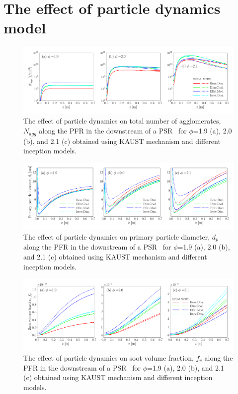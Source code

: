 \section{The effect of particle dynamics model}

\begin{figure}[H]
	\centering
	\includegraphics[width=1\textwidth]{Figures/Results/PSR/N_agg_eq_ratio_pdynamiceffect.pdf}
	\caption{The effect of particle dynamics on total number of agglomerates, $N_{agg}$ along the PFR in the downstream of a PSR~\citep{manzello2007soot} for $\phi$=1.9 (a), 2.0 (b), and 2.1 (c) obtained using KAUST mechanism and different inception models.}
	\label{fig:psr_Nagg_pdynamicseffect} 
\end{figure}

\begin{figure}[H]
	\centering
	\includegraphics[width=1\textwidth]{Figures/Results/PSR/d_p_eq_ratio_pdynamiceffect.pdf}
	\caption{The effect of particle dynamics on primary particle diameter, $d_{p}$ along the PFR in the downstream of a PSR~\citep{manzello2007soot} for $\phi$=1.9 (a), 2.0 (b), and 2.1 (c) obtained using KAUST mechanism and different inception models.}
	\label{fig:psr_d_p_pdynamicseffect} 
\end{figure}


\begin{figure}[H]
	\centering
	\includegraphics[width=1\textwidth]{Figures/Results/PSR/f_v_eq_ratio_pdynamiceffect.pdf}
	\caption{The effect of particle dynamics on soot volume fraction, $f_{v}$ along the PFR in the downstream of a PSR~\citep{manzello2007soot} for $\phi$=1.9 (a), 2.0 (b), and 2.1 (c) obtained using KAUST mechanism and different inception models.}
	\label{fig:psr_f_v_pdynamicseffect} 
\end{figure}

